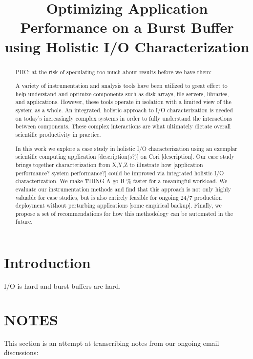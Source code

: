 \documentclass[conference,10pt,compsocconf]{IEEEtran}
\begin{document}
\title{Optimizing Application Performance on a Burst Buffer using
Holistic I/O Characterization}

\maketitle

\begin{abstract}

PHC: at the risk of speculating too much about results before we have them:

A variety of instrumentation and analysis tools have been utilized to
great effect to help understand and optimize components such as disk
arrays, file servers, libraries, and applications.  However, these
tools operate in isolation with a limited view of the system as a whole.
An integrated, holistic approach to I/O characterization is needed on
today's increasingly complex systems in order to fully understand
the interactions between components.  These complex interactions are what 
ultimately dictate overall scientific productivity in practice.

In this work we explore a case study in holistic I/O characterization
using an exemplar scientific computing application [description(s?)] on
Cori [description].  Our case study brings together characterization from
X,Y,Z to illustrate how [application performance?  system performance?]
could be improved via integrated holistic I/O characterization.
We make THING A go B \% faster for a meaningful workload.  We evaluate
our instrumentation methods and find that this approach is not only
highly valuable for case studies, but is also entirely feasible for
ongoing 24/7 production deployment without perturbing applications [some
empirical backup].  Finally, we propose a set of recommendations for
how this methodology can be automated in the future.

\end{abstract}

\section{Introduction}

I/O is hard and burst buffers are hard.

\section{NOTES}

This section is an attempt at transcribing notes from our ongoing email
discussions:
\end{document}
